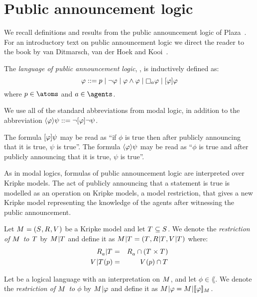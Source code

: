 \section{Public announcement logic}\label{pal}

We recall definitions and results from the public announcement logic of Plaza~\cite{plaza:1989}.
For an introductory text on public announcement logic we direct the reader to the book by van Ditmarsch, van der Hoek and Kooi~\cite{vanditmarsch:2007}.

\begin{definition}
The {\em language of public announcement logic}, \langPal{}, is inductively defined as:
$$
\phi ::= 
    \atomP \mid
    \lnot \phi \mid
    \phi \land \phi \mid
    \necessaryA \phi \mid
    \announceA{\phi} \phi
$$
where $\atomP \in \atoms$ and $\agentA \in \agents$.
\end{definition}

We use all of the standard abbreviations from modal logic, in addition to the abbreviation $\langle \varphi \rangle \psi ::= \lnot [ \varphi ] \lnot \psi$.

The formula $[ \varphi ] \psi$ may be read as ``if $\phi$ is true then after publicly announcing that it is true, $\psi$ is true''.
The formula $\langle \varphi \rangle \psi$ may be read as ``$\phi$ is true and after publicly announcing that it is true, $\psi$ is true''.

As in modal logics, formulas of public announcement logic are interpreted over Kripke models.
The act of publicly announcing that a statement is true is modelled as an operation on Kripke models, a model restriction, that gives a new Kripke model representing the knowledge of the agents after witnessing the public announcement.

\begin{definition}
Let $\kModelAndTuple$ be a Kripke model and let $\kStatesT \subseteq \kStates$.
We denote the {\em restriction of $\kModel$ to $\kStatesT$} by $\restrict{\kModel}{\kStatesT}$ and
define it as $\restrict{\kModel}{\kStatesT} = (\kStatesT, \restrict{\kAccessibilityRel}{\kStatesT}, \restrict{\kValuation}{\kStatesT})$ where:
\begin{eqnarray*}
    \restrict{\kAccessibilityA}{\kStatesT} &=& \kAccessibilityA \cap (\kStatesT \times \kStatesT)\\
    \restrict{\kValuation}{\kStatesT}(\atomP) &=& \kValuation(\atomP) \cap \kStatesT
\end{eqnarray*}

Let \lang{} be a logical language with an interpretation on $\kModel$, and let $\phi \in \lang$.
We denote the {\em restriction of $\kModel$ to $\phi$} by $\restrict{\kModel}{\phi}$ and define it as $\restrict{\kModel}{\phi} = \restrict{\kModel}{\interpretation[\kModel]{\phi}}$.
\end{definition}

